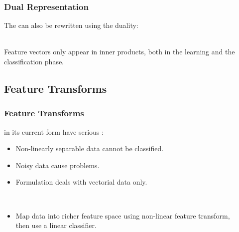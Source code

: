 \begin{frame}
  \frametitle{Dual Representation}

  The  can also be rewritten using the duality:

  \begin{center}
  \end{center}
  \pause

  \vspace{.5cm}
   \\[.2cm]
 
  Feature vectors only appear in inner products, both in the learning and the classification phase.
\end{frame}


\subsection{Feature Transforms}

\begin{frame}
  \frametitle{Feature Transforms}

   in its current form have serious : \\[.2cm]
  
  \begin{itemize}
    \item  Non-linearly separable data cannot be classified. \\[.3cm]
    \item  Noisy data cause problems. \\[.3cm]
    \item  Formulation deals with vectorial data only.
  \end{itemize}
  \pspread

   \\[.2cm]

  \begin{itemize}
    \item Map data into richer feature space using non-linear feature transform, \\
      then use a linear classifier.
  \end{itemize}
\end{frame}


